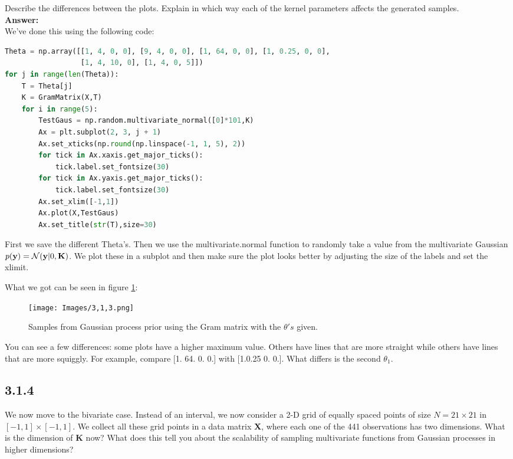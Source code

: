\documentclass[a4paper]{article}
\begin{document}
Describe the differences between the plots. Explain in which way each of the kernel parameters affects the generated samples.\\


\textbf{Answer:}\\


We've done this using the following code:


\begin{lstlisting}[language=Python]
Theta = np.array([[1, 4, 0, 0], [9, 4, 0, 0], [1, 64, 0, 0], [1, 0.25, 0, 0],
                  [1, 4, 10, 0], [1, 4, 0, 5]])
for j in range(len(Theta)):
    T = Theta[j]
    K = GramMatrix(X,T) 
    for i in range(5):
        TestGaus = np.random.multivariate_normal([0]*101,K)
        Ax = plt.subplot(2, 3, j + 1)
        Ax.set_xticks(np.round(np.linspace(-1, 1, 5), 2))
        for tick in Ax.xaxis.get_major_ticks():
            tick.label.set_fontsize(30)
        for tick in Ax.yaxis.get_major_ticks():
            tick.label.set_fontsize(30)
        Ax.set_xlim([-1,1])
        Ax.plot(X,TestGaus)
        Ax.set_title(str(T),size=30)
\end{lstlisting}

First we save the different Theta's. Then we use the multivariate.normal function to randomly take a value from the multivariate Gaussian $p(\textbf y) = \mathcal N (\textbf y | 0,\textbf K)$. We plot these in a subplot and then make sure the plot looks better by adjusting the size of the labels and set the xlimit.

What we got can be seen in figure \ref{3.1.3}:

\begin{figure}[H]
\texttt{[image: Images/3,1,3.png]}
\caption{Samples from Gaussian process prior using the Gram matrix with the $\theta's$ given.}
\label{3.1.3}
\end{figure}

You can see a few differences: some plots have a higher maximum value. Others have lines that are more straight while others have lines that are more squiggly. For example, compare [1. 64. 0. 0.] with [1.0.25 0. 0.]. What differs is the second $\theta_1$. %

\subsection*{3.1.4}

We now move to the bivariate case. Instead of an interval, we now consider a 2-D grid of equally spaced points of size $N = 21 \times 21$ in $[-1,1] \times [-1,1]$. We collect all these grid points in a data matrix \textbf{X}, where each one of the 441 observations has two dimensions. What is the dimension of \textbf{K} now? What does this tell you about the scalability of sampling multivariate functions from Gaussian processes in higher dimensions?\\
\end{document}

